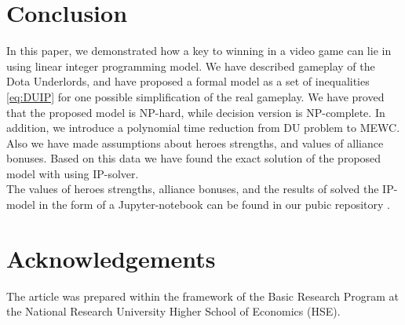 \documentclass[smallextended]{svjour3}       %
\begin{document}
\section{Conclusion}
\label{SectionConclusion}
In this paper, we demonstrated how a key to winning in a video game can lie in using linear integer  programming model. We have described gameplay of the Dota Underlords, and have proposed a formal model as a set of inequalities \eqref{eq:DUIP} for one possible simplification of the real gameplay. We have proved that the proposed model is NP-hard, while decision version is NP-complete. In addition, we introduce a polynomial time reduction from DU problem to MEWC. Also we have made assumptions about heroes strengths, and values of alliance bonuses. Based on this data we have found the exact solution of the proposed model with using IP-solver. \\
The values of heroes  strengths, alliance bonuses, and  the results of solved the IP-model in the form of a Jupyter-notebook can be found in our pubic repository \cite{UnderLordsInput}.
\section{Acknowledgements}
The article was prepared within the framework of the Basic Research Program at the National Research University Higher School of Economics (HSE).



\end{document}
